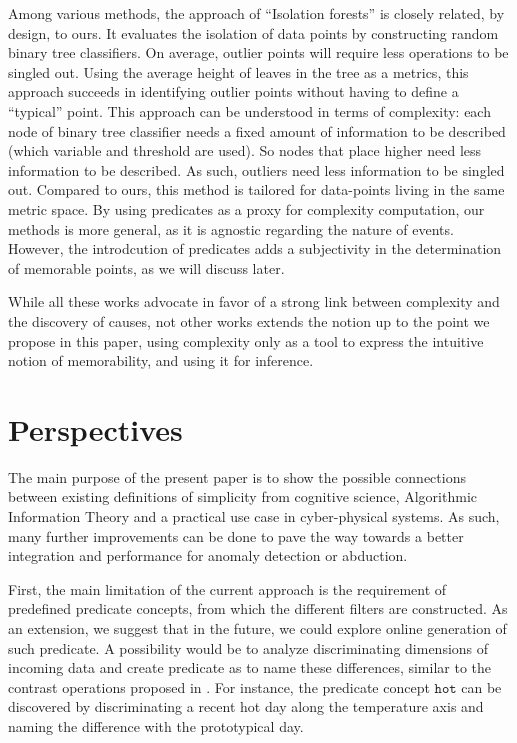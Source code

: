 \documentclass[conference]{IEEEtran}
\begin{document}
Among various methods, the approach of ``Isolation forests''\cite{liu_isolation_2008,hariri_extended_2021} is closely related, by design, to ours. It evaluates the isolation of data points by constructing random binary tree classifiers. On average, outlier points will require less operations to be singled out. Using the average height of leaves in the tree as a metrics, this approach succeeds in identifying outlier points without having to define a ``typical'' point. This approach can be understood in terms of complexity: each node of binary tree classifier needs a fixed amount of information to be described (which variable and threshold are used). So nodes that place higher need less information to be described. As such, outliers need less information to be singled out. Compared to ours, this method is tailored for data-points living in the same metric space. By using predicates as a proxy for complexity computation, our methods is more general, as it is agnostic regarding the nature of events. However, the introdcution of predicates adds a subjectivity in the determination of memorable points, as we will discuss later.

While all these works advocate in favor of a strong link between complexity and the
discovery of causes, not other works extends the notion up to the point we propose in this paper, using complexity only as a tool to express the intuitive notion of memorability, and using it for inference.

\section{Perspectives}
\label{sec:future}
The main purpose of the present paper is to show the possible connections
between existing definitions of simplicity from cognitive science, Algorithmic
Information Theory and a practical use case in cyber-physical systems. As such,
many further improvements can be done to pave the way towards a better
integration and performance for anomaly detection or abduction.

First, the main limitation of the current approach is the requirement of
predefined predicate concepts, from which the different filters are constructed.
As an extension, we suggest that in the future, we could explore online
generation of such predicate. A possibility would be to analyze discriminating
dimensions of incoming data and create predicate as to name these differences,
similar to the contrast operations proposed in \cite{dessalles_conceptual_2015,
  gardenfors2004conceptual}. For instance, the predicate concept $\mathtt{hot}$
can be discovered by discriminating a recent hot day along the
temperature axis and naming the difference with the prototypical day.
\end{document}
